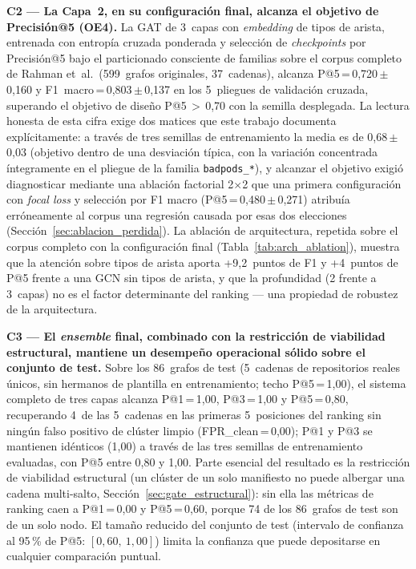 \textbf{C2 — La Capa~2, en su configuración final, alcanza el objetivo de
Precisión@5 (OE4).} La \ac{GAT} de 3~capas con \textit{embedding} de tipos de
arista, entrenada con entropía cruzada ponderada y selección de
\textit{checkpoints} por Precisión@5 bajo el particionado consciente de familias
sobre el corpus completo de Rahman et~al.\ (599~grafos originales, 37~cadenas),
alcanza P@5\,=\,0,720\,\(\pm\)\,0,160 y F1~macro\,=\,0,803\,\(\pm\)\,0,137
en los 5~pliegues de validación cruzada, superando el objetivo de diseño
P@5\,\(>\)\,0,70 con la semilla desplegada. La lectura honesta de esta cifra
exige dos matices que este trabajo documenta explícitamente: a través de tres
semillas de entrenamiento la media es de 0,68\,\(\pm\)\,0,03 (objetivo dentro
de una desviación típica, con la variación concentrada íntegramente en el
pliegue de la familia \texttt{badpods\_*}), y alcanzar el objetivo exigió
diagnosticar mediante una ablación factorial 2\(\times\)2 que una primera
configuración con \textit{focal loss} y selección por F1 macro
(P@5\,=\,0,480\,\(\pm\)\,0,271) atribuía erróneamente al corpus una regresión
causada por esas dos elecciones (Sección~\ref{sec:ablacion_perdida}). La
ablación de arquitectura, repetida sobre el corpus completo con la configuración
final (Tabla~\ref{tab:arch_ablation}), muestra que la atención sobre tipos de
arista aporta +9,2~puntos de F1 y +4~puntos de P@5 frente a una \ac{GCN} sin
tipos de arista, y que la profundidad (2 frente a 3~capas) no es el factor
determinante del ranking — una propiedad de robustez de la arquitectura.

\textbf{C3 — El \textit{ensemble} final, combinado con la restricción de
viabilidad estructural, mantiene un desempeño operacional sólido sobre el
conjunto de test.} Sobre los 86~grafos de test (5~cadenas de repositorios reales
únicos, sin hermanos de plantilla en entrenamiento; techo P@5\,=\,1,00), el
sistema completo de tres capas alcanza P@1\,=\,1,00, P@3\,=\,1,00 y
P@5\,=\,0,80, recuperando 4~de las 5~cadenas en las primeras 5~posiciones del
ranking sin ningún falso positivo de clúster limpio
(\ac{FPR}\_clean\,=\,0,00); P@1 y P@3 se mantienen idénticos (1,00) a través de
las tres semillas de entrenamiento evaluadas, con P@5 entre 0,80 y 1,00. Parte esencial del resultado es la
restricción de viabilidad estructural (un clúster de un solo manifiesto no puede
albergar una cadena multi-salto, Sección~\ref{sec:gate_estructural}): sin ella
las métricas de ranking caen a P@1\,=\,0,00 y P@5\,=\,0,60, porque 74 de los
86~grafos de test son de un solo nodo. El tamaño reducido del conjunto de test
(intervalo de confianza al 95\,\% de P@5: \([0{,}60,\ 1{,}00]\)) limita la
confianza que puede depositarse en cualquier comparación puntual.

